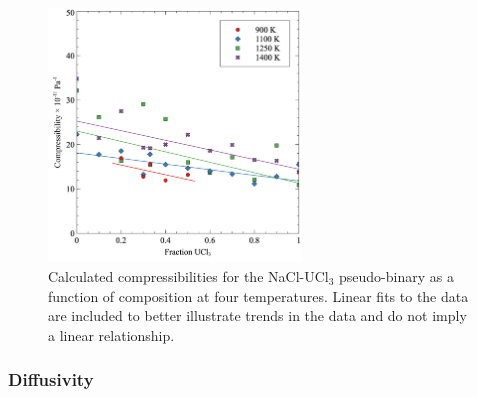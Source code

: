 \documentclass[preprint,3p,10pt,onecolumn,number,sort&compress]{elsarticle}
\begin{document}
\begin{figure}[htb]
\centering
\includegraphics[width=0.6\textwidth]{figbulk.jpg}
\caption{Calculated compressibilities for the NaCl-UCl{$_3$} pseudo-binary as a function of composition at four temperatures. Linear fits to the data are included to better illustrate trends in the data and do not imply a linear relationship.} 
\label{fig:compress}
\end{figure}

\FloatBarrier

\subsubsection{Diffusivity}
\end{document}
